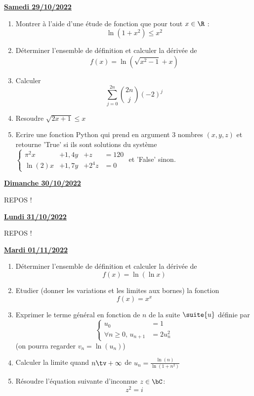 \documentclass[a4paper, 11pt,reqno]{article}
\newcommand{\jour}[1]{
\begin{center}
\underline{\textbf{#1}}
\end{center}

 }
\begin{document}
\jour{Samedi 29/10/2022}
\begin{exercice}
\begin{enumerate}
\item  Montrer à l'aide d'une étude de fonction que pour tout $x\in\R$ : 
$$\ln(1+x^2) \leq x^2$$

\item  Déterminer l'ensemble de définition et calculer la dérivée de
$$f(x)=\ln{(\sqrt{x^2-1}+x)}$$
\item  Calculer 
$$\sum_{j=0}^{2n} \binom{2n}{j}(-2)^j$$

\item Resoudre $\sqrt{2x+1} \leq x$ 

\item Ecrire une fonction Python qui prend en argument 3 nombres $(x,y,z)$ et retourne 'True' si ils sont solutions du système
$\left\{ 
\begin{array}{rrrl}
\pi^2x&+1,4 y&+z&=120\\
\ln(2) x&+1,7y&+2^4z&=0
\end{array}
\right.$
et 'False' sinon. 
\end{enumerate}
\end{exercice}

\jour{Dimanche 30/10/2022}
REPOS ! 
\jour{Lundi 31/10/2022}
REPOS ! 

\jour{Mardi 01/11/2022}
\begin{exercice}
\begin{enumerate}
\item  Déterminer l'ensemble de définition et calculer la dérivée de
$$f(x)=\ln{(\ln{x})}$$
\item  Etudier (donner les variations et les limites aux bornes)  la fonction $$f(x) =x^x$$
\item Exprimer le terme général en fonction de $n$ de la suite $\suite{u}$ définie par 
$$\left\{\begin{array}{rl}
u_0 &=1\\
\forall n\geq 0,\,  u_{n+1}&=2u_n^2
\end{array}\right.$$
(on pourra regarder $v_n=\ln(u_n)$)

\item Calculer la limite quand $n\tv+\infty$ de $u_n=\frac{\ln(n)}{\ln(1+n^2)}$
\item Résoudre l'équation suivante d'inconnue $z\in \bC$:
$$z^2 =i$$
\end{enumerate}
\end{exercice}
\end{document}
